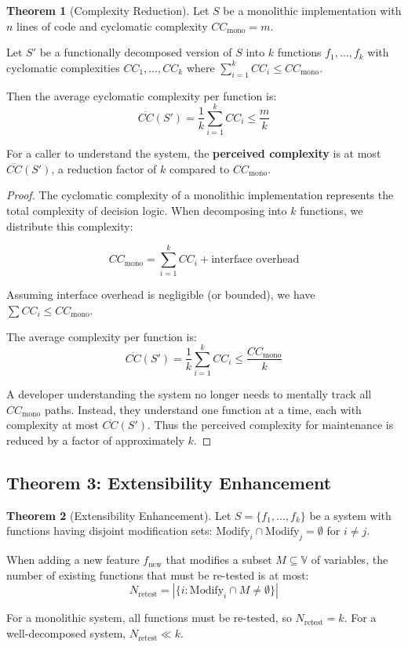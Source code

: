 \documentclass[a4paper,12pt]{article}
\theoremstyle{definition}
\newtheorem{theorem}{Theorem}
\begin{document}
\begin{theorem}[Complexity Reduction]
\label{thm:complexity_reduction}
Let $S$ be a monolithic implementation with $n$ lines of code and cyclomatic complexity $CC_{\mathrm{mono}} = m$. 

Let $S'$ be a functionally decomposed version of $S$ into $k$ functions $f_1, \ldots, f_k$ with cyclomatic complexities $CC_1, \ldots, CC_k$ where $\sum_{i=1}^{k} CC_i \leq CC_{\mathrm{mono}}$.

Then the average cyclomatic complexity per function is:
\[
\overline{CC}(S') = \frac{1}{k} \sum_{i=1}^{k} CC_i \leq \frac{m}{k}
\]

For a caller to understand the system, the \textbf{perceived complexity} is at most $\overline{CC}(S')$, a reduction factor of $k$ compared to $CC_{\mathrm{mono}}$.
\end{theorem}

\begin{proof}
The cyclomatic complexity of a monolithic implementation represents the total complexity of decision logic. When decomposing into $k$ functions, we distribute this complexity:

\[
CC_{\mathrm{mono}} = \sum_{i=1}^{k} CC_i + \text{interface overhead}
\]

Assuming interface overhead is negligible (or bounded), we have $\sum CC_i \leq CC_{\mathrm{mono}}$.

The average complexity per function is:
\[
\overline{CC}(S') = \frac{1}{k} \sum_{i=1}^{k} CC_i \leq \frac{CC_{\mathrm{mono}}}{k}
\]

A developer understanding the system no longer needs to mentally track all $CC_{\mathrm{mono}}$ paths. Instead, they understand one function at a time, each with complexity at most $\overline{CC}(S')$. Thus the perceived complexity for maintenance is reduced by a factor of approximately $k$. \qedhere
\end{proof}

\subsection{Theorem 3: Extensibility Enhancement}

\begin{theorem}[Extensibility Enhancement]
\label{thm:extensibility}
Let $S = \{f_1, \ldots, f_k\}$ be a system with functions having disjoint modification sets: $\mathrm{Modify}_i \cap \mathrm{Modify}_j = \emptyset$ for $i \neq j$.

When adding a new feature $f_{\text{new}}$ that modifies a subset $M \subseteq \mathbb{V}$ of variables, the number of existing functions that must be re-tested is at most:
\[
N_{\text{retest}} = |\{i : \mathrm{Modify}_i \cap M \neq \emptyset\}|
\]

For a monolithic system, all functions must be re-tested, so $N_{\text{retest}} = k$. For a well-decomposed system, $N_{\text{retest}} \ll k$.
\end{theorem}
\end{document}

